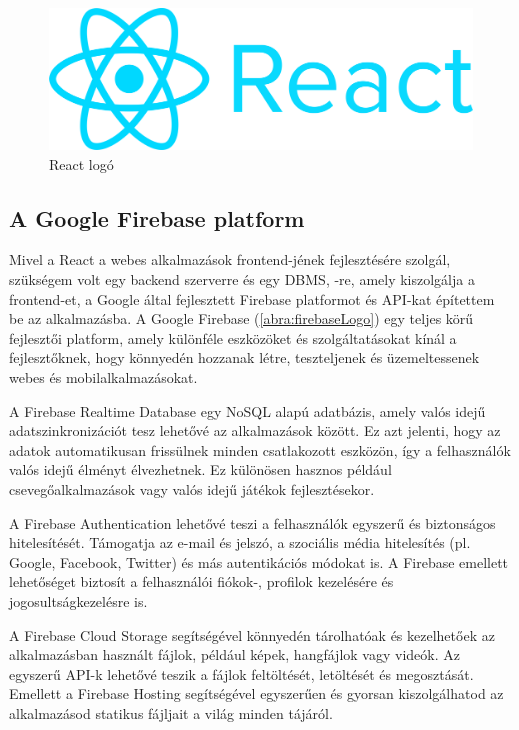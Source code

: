 \begin{figure}[!h]
	\centering
	\includegraphics[scale=0.04]{images/reactLogo}
	\caption{React logó}
	\label{abra:reactLogo}
\end{figure}

\subsection {A Google Firebase platform}

Mivel a React a webes alkalmazások frontend-jének fejlesztésére szolgál, szükségem volt egy backend szerverre és egy DBMS, -re, amely kiszolgálja a frontend-et, a Google által fejlesztett Firebase platformot és API-kat építettem be az alkalmazásba.
A Google Firebase (\ref{abra:firebaseLogo}) egy teljes körű fejlesztői platform, amely különféle eszközöket és szolgáltatásokat kínál a fejlesztőknek, hogy könnyedén hozzanak létre, teszteljenek és üzemeltessenek webes és mobilalkalmazásokat.

A Firebase Realtime Database egy NoSQL alapú adatbázis, amely valós idejű adatszinkronizációt tesz lehetővé az alkalmazások között. Ez azt jelenti, hogy az adatok automatikusan frissülnek minden csatlakozott eszközön, így a felhasználók valós idejű élményt élvezhetnek. Ez különösen hasznos például csevegőalkalmazások vagy valós idejű játékok fejlesztésekor. 

A Firebase Authentication lehetővé teszi a felhasználók egyszerű és biztonságos hitelesítését. Támogatja az e-mail és jelszó, a szociális média hitelesítés (pl. Google, Facebook, Twitter) és más autentikációs módokat is. A Firebase emellett lehetőséget biztosít a felhasználói fiókok-, profilok kezelésére és jogosultságkezelésre is. 

\pagebreak
A Firebase Cloud Storage segítségével könnyedén tárolhatóak és kezelhetőek az alkalmazásban használt fájlok, például képek, hangfájlok vagy videók. Az egyszerű API-k lehetővé teszik a fájlok feltöltését, letöltését és megosztását. Emellett a Firebase Hosting segítségével egyszerűen és gyorsan kiszolgálhatod az alkalmazásod statikus fájljait a világ minden tájáról.

